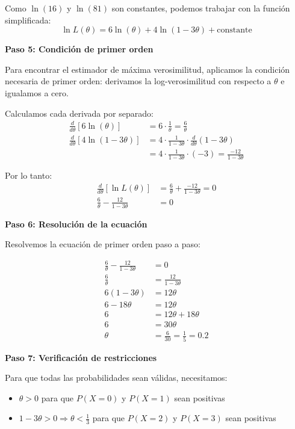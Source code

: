 \documentclass[11pt,a4paper]{article}
\begin{document}
Como $\ln(16)$ y $\ln(81)$ son constantes, podemos trabajar con la función simplificada:
\[
\ln L(\theta) = 6\ln(\theta) + 4\ln(1-3\theta) + \text{constante}
\]

\textbf{Paso 5: Condición de primer orden}

Para encontrar el estimador de máxima verosimilitud, aplicamos la condición necesaria de primer orden: derivamos la log-verosimilitud con respecto a $\theta$ e igualamos a cero.

Calculamos cada derivada por separado:
\begin{align*}
\frac{d}{d\theta}[6\ln(\theta)] &= 6 \cdot \frac{1}{\theta} = \frac{6}{\theta} \\
\frac{d}{d\theta}[4\ln(1-3\theta)] &= 4 \cdot \frac{1}{1-3\theta} \cdot \frac{d}{d\theta}(1-3\theta) \\
&= 4 \cdot \frac{1}{1-3\theta} \cdot (-3) = \frac{-12}{1-3\theta}
\end{align*}

Por lo tanto:
\begin{align*}
\frac{d}{d\theta}[\ln L(\theta)] &= \frac{6}{\theta} + \frac{-12}{1-3\theta} = 0 \\
\frac{6}{\theta} - \frac{12}{1-3\theta} &= 0
\end{align*}

\textbf{Paso 6: Resolución de la ecuación}

Resolvemos la ecuación de primer orden paso a paso:

\begin{align*}
\frac{6}{\theta} - \frac{12}{1-3\theta} &= 0 \\
\frac{6}{\theta} &= \frac{12}{1-3\theta} \\
6(1-3\theta) &= 12\theta \\
6 - 18\theta &= 12\theta \\
6 &= 12\theta + 18\theta \\
6 &= 30\theta \\
\theta &= \frac{6}{30} = \frac{1}{5} = 0.2
\end{align*}

\textbf{Paso 7: Verificación de restricciones}

Para que todas las probabilidades sean válidas, necesitamos:
\begin{itemize}
    \item $\theta > 0$ para que $P(X=0)$ y $P(X=1)$ sean positivas
    \item $1-3\theta > 0 \Rightarrow \theta < \frac{1}{3}$ para que $P(X=2)$ y $P(X=3)$ sean positivas
\end{itemize}
\end{document}
